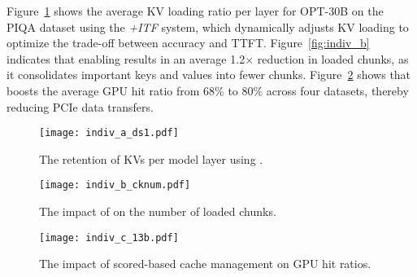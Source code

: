 
Figure~\ref{fig:indiv_a} shows the average KV loading ratio per layer for OPT-30B on the PIQA dataset using the \textit{+ITF} system, which dynamically adjusts KV loading to optimize the trade-off between accuracy and TTFT.
Figure~\ref{fig:indiv_b} indicates that enabling \techba{} results in an average 1.2$\times$ reduction in loaded chunks, as it consolidates important keys and values into fewer chunks.
Figure~\ref{fig:indiv_c} shows that \techbb{} boosts the average GPU hit ratio from 68\% to 80\% across four datasets, thereby reducing PCIe data transfers.


\begin{figure}
	\centering
	\texttt{[image: indiv\_a\_ds1.pdf]}
	\vspace{-0.1in}
	\caption{The retention of KVs per model layer using \techa{}.}
	\label{fig:indiv_a}
	 \vspace{-0.1in}
\end{figure}


\begin{figure}
	\centering
	\begin{minipage}{1.6in}
		\texttt{[image: indiv\_b\_cknum.pdf]}
		\vspace{-0.2in}
		\caption{
			The impact of \techba{} on the number of loaded chunks.
		}
		\label{fig:indiv_b}
	\end{minipage}
	\hspace{0.05in}
	\begin{minipage}{1.6in}
		\centering
		\texttt{[image: indiv\_c\_13b.pdf]}
		\vspace{-0.2in}
		\caption{
			The impact of scored-based cache management on GPU hit ratios.
		}
		\label{fig:indiv_c}
	\end{minipage} 
	\vspace{-0.2in}
\end{figure}




